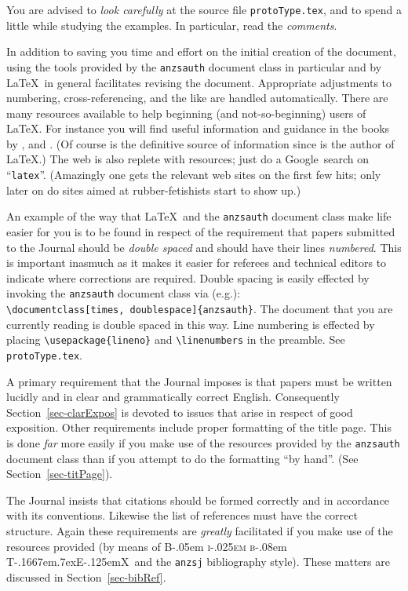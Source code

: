 \documentclass[
  times,
  doublespace]{anzsauth}
\newcommand\BibTeX{{\rmfamily B\kern-.05em \textsc{i\kern-.025em b}\kern-.08em
T\kern-.1667em\lower.7ex\hbox{E}\kern-.125emX}}
\begin{document}
You are advised to \emph{look carefully} at the source file
\texttt{protoType.tex}, and to spend a little while studying the
examples. In particular, read the \emph{comments}.

In addition to saving you time and effort on the initial creation of the
document, using the tools provided by the \texttt{anzsauth} document
class in particular and by \LaTeX~in general facilitates revising the
document. Appropriate adjustments to numbering, cross-referencing, and
the like are handled automatically. There are many resources available
to help beginning (and not-so-beginning) users of \LaTeX. For instance
you will find useful information and guidance in the books by
\citet{KopkaDaly2003}, \citet{Lamport1994} and
\citet{MittelbachGoossens2004}. (Of course \citet{Lamport1994} is the
definitive source of information since \citet{Lamport1994} is the author
of \LaTeX.) The web is also replete with resources; just do a
Google\texttrademark~search on ``\texttt{latex}''. (Amazingly one gets
the relevant web sites on the first few hits; only later on do sites
aimed at rubber-fetishists start to show up.)

An example of the way that \LaTeX~and the \texttt{anzsauth} document
class make life easier for you is to be found in respect of the
requirement that papers submitted to the Journal should be \emph{double
spaced} and should have their lines \emph{numbered}. This is important
inasmuch as it makes it easier for referees and technical editors to
indicate where corrections are required. Double spacing is easily
effected by invoking the \texttt{anzsauth} document class via (e.g.):
\label{pg:dsln}
\texttt{\textbackslash{}documentclass{[}times,\ doublespace{]}\{anzsauth\}}.
The document that you are currently reading is double spaced in this
way. Line numbering is effected by placing
\texttt{\textbackslash{}usepackage\{lineno\}} and
\texttt{\textbackslash{}linenumbers} in the preamble. See
\texttt{protoType.tex}.

A primary requirement that the Journal imposes is that papers must be
written lucidly and in clear and grammatically correct English.
Consequently Section~\ref{sec-clarExpos} is devoted to issues that arise
in respect of good exposition. Other requirements include proper
formatting of the title page. This is done \emph{far} more easily if you
make use of the resources provided by the \texttt{anzsauth} document
class than if you attempt to do the formatting ``by hand''. (See
Section~\ref{sec-titPage}).

The Journal insists that citations should be formed correctly and in
accordance with its conventions. Likewise the list of references must
have the correct structure. Again these requirements are \emph{greatly}
facilitated if you make use of the resources provided (by means of
\BibTeX~and the \texttt{anzsj} bibliography style). These matters are
discussed in Section~\ref{sec-bibRef}.
\end{document}

